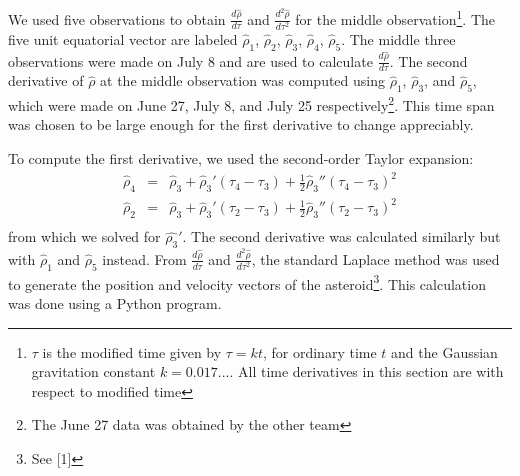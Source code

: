 \documentclass[11pt,a4paper]{article}
\begin{document}
We used five observations to obtain $\frac{d\hat{\rho}}{d\tau}$ and $\frac{d^2\hat{\rho}}{d\tau^2}$ for the middle observation\footnote{$\tau$ is the modified time given by $\tau=kt$, for ordinary time $t$ and the Gaussian gravitation constant $k=0.017...$.
All time derivatives in this section are with respect to modified time}. 
The five unit equatorial vector are labeled $\hat{\rho}_1$, $\hat{\rho}_2$, $\hat{\rho}_3$, $\hat{\rho}_4$, $\hat{\rho}_5$. The middle three observations were made on July 8 and are used to calculate $\frac{d\hat{\rho}}{d\tau}$.
The second derivative of $\hat{\rho}$ at the middle observation was  computed using  $\hat{\rho}_1$, $\hat{\rho}_3$, and  $\hat{\rho}_5$, which were made on June 27, July 8, and July 25 respectively\footnote{The June 27 data was obtained by the other team}.
This time span was chosen to be large enough for the first derivative to change appreciably.

To compute the first derivative, we used the second-order Taylor expansion:
\begin{eqnarray*}
\hat{\rho}_4&=&\hat{\rho}_3+\hat{\rho}_3' (\tau_4-\tau_3)+\frac{1}{2}\hat{\rho}_3'' (\tau_4-\tau_3)^2\\
\hat{\rho}_2&=&\hat{\rho}_3+\hat{\rho}_3' (\tau_2-\tau_3)+\frac{1}{2}\hat{\rho}_3'' (\tau_2-\tau_3) ^2\\
\end{eqnarray*}
from which we solved for $\hat{\rho_3}'$.
The second derivative was calculated similarly but with   $\hat{\rho}_1$ and $\hat{\rho}_5$ instead.
From $\frac{d\hat{\rho}}{d\tau}$ and $\frac{d^2\hat{\rho}}{d\tau^2}$, the standard Laplace method was used to generate the position and velocity vectors of the asteroid\footnote{See [1]}.
This calculation was done using a Python program.
\end{document}
